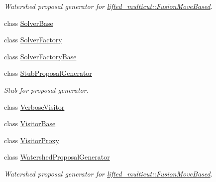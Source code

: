 \begin{DoxyCompactItemize}
\begin{DoxyCompactList}\small\item\em Watershed proposal generator for \hyperlink{classnifty_1_1graph_1_1opt_1_1lifted__multicut_1_1FusionMoveBased}{lifted\+\_\+multicut\+::\+Fusion\+Move\+Based}. \end{DoxyCompactList}\item 
class \hyperlink{classnifty_1_1graph_1_1opt_1_1common_1_1SolverBase}{Solver\+Base}
\item 
class \hyperlink{classnifty_1_1graph_1_1opt_1_1common_1_1SolverFactory}{Solver\+Factory}
\item 
class \hyperlink{classnifty_1_1graph_1_1opt_1_1common_1_1SolverFactoryBase}{Solver\+Factory\+Base}
\item 
class \hyperlink{classnifty_1_1graph_1_1opt_1_1common_1_1StubProposalGenerator}{Stub\+Proposal\+Generator}
\begin{DoxyCompactList}\small\item\em Stub for proposal generator. \end{DoxyCompactList}\item 
class \hyperlink{classnifty_1_1graph_1_1opt_1_1common_1_1VerboseVisitor}{Verbose\+Visitor}
\item 
class \hyperlink{classnifty_1_1graph_1_1opt_1_1common_1_1VisitorBase}{Visitor\+Base}
\item 
class \hyperlink{classnifty_1_1graph_1_1opt_1_1common_1_1VisitorProxy}{Visitor\+Proxy}
\item 
class \hyperlink{classnifty_1_1graph_1_1opt_1_1common_1_1WatershedProposalGenerator}{Watershed\+Proposal\+Generator}
\begin{DoxyCompactList}\small\item\em Watershed proposal generator for \hyperlink{classnifty_1_1graph_1_1opt_1_1lifted__multicut_1_1FusionMoveBased}{lifted\+\_\+multicut\+::\+Fusion\+Move\+Based}. \end{DoxyCompactList}\end{DoxyCompactItemize}
